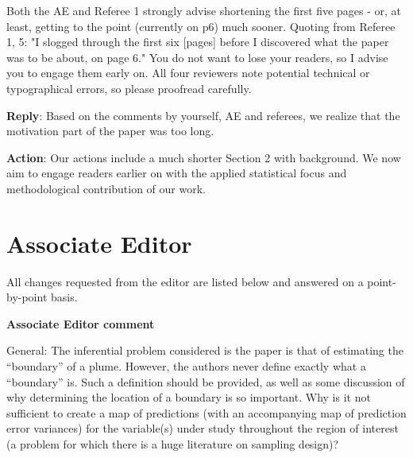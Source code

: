 \documentclass[a4paper]{article}
\newcounter{reviewer}
\def\aecom{\textbf{Associate Editor comment}}
\def\reply{\textbf{Reply}}
\def\action{\textbf{Action}}
\begin{document}

\vspace{5mm}

Both the AE and Referee 1 strongly advise shortening the first
five pages - or, at least, getting to the point (currently on p6)
much sooner.  Quoting from  Referee 1, 5: "I slogged through the 
first six [pages] before I discovered what the paper was to be 
about, on page 6."  You do not want to lose your readers, so I
advise you to engage them early on.  All four reviewers note
potential technical or typographical errors, so please proofread
carefully.

\reply: Based on the comments by yourself, AE and referees, we realize that the motivation part of the paper was too long. 

\action: Our actions include a much shorter Section 2 with background. We now aim to engage readers earlier on with the applied statistical focus and methodological contribution of our work. 



 \section*{Associate Editor}
All changes requested from the editor are listed below and answered on a point-by-point basis.

\setcounter{reviewer}{1}





\vspace{5mm}
\noindent \aecom 

General: The inferential problem considered is the paper is that of estimating the “boundary” of a plume. However, the authors never define exactly what a “boundary” is. Such a definition should be provided, as well as some discussion of why determining the location of a boundary is so important. Why is it not sufficient to create a map of predictions (with an accompanying map of prediction error variances) for the variable(s) under study throughout the region of interest (a problem for which there is a huge literature on sampling design)?\par
\end{document}
